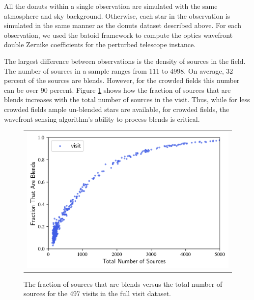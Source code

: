 All the donuts within a single observation are simulated with the same atmosphere and sky background. Otherwise, each star in the observation is simulated in the same manner as the donuts dataset described above. For each observation, we used the batoid framework to compute the optics wavefront double Zernike coefficients for the perturbed telescope instance.

The largest difference between observations is the density of sources in the field. The number of sources in a sample ranges from 111 to 4998. On average, 32 percent of the sources are blends. However, for the crowded fields this number can be over 90 percent. Figure \ref{fig:blendfraction} shows how the fraction of sources that are blends increases with the total number of sources in the visit. Thus, while for less crowded fields ample un-blended stars are available, for crowded fields, the wavefront sensing algorithm's ability to process blends is critical.

\begin{figure} [!htbp]
\begin{center}
\begin{tabular}{c}
\includegraphics[width=4.5in]{figs/simulating_donuts/blendfraction.png}
\end{tabular}
\end{center}
\caption[Fraction of Blended Sources]{The fraction of sources that are blends versus the total number of sources for the 497 visits in the full visit dataset.\label{fig:blendfraction}}
\end{figure}
